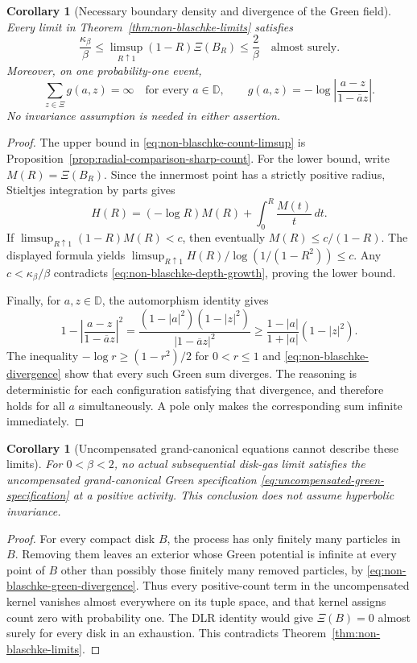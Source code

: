 \documentclass[11pt,a4paper]{article}
\numberwithin{equation}{section}
\newtheorem{corollary}[theorem]{Corollary}
\theoremstyle{definition}
\theoremstyle{remark}
\newcommand{\D}{\mathbb D}
\begin{document}
\begin{corollary}[Necessary boundary density and divergence of the Green field]
\label{cor:non-blaschke-boundary-consequences}
Every limit in Theorem~\ref{thm:non-blaschke-limits} satisfies
\begin{equation}
 \frac{\kappa_\beta}{\beta}
 \le\limsup_{R\uparrow1}(1-R)\Xi(B_R)
 \le\frac2\beta
 \quad\text{almost surely}.
 \label{eq:non-blaschke-count-limsup}
\end{equation}
Moreover, on one probability-one event,
\begin{equation}
 \sum_{z\in\Xi}g(a,z)=\infty
 \quad\text{for every }a\in\D,
 \qquad g(a,z)=-\log\left|\frac{a-z}{1-\overline a z}\right|.
 \label{eq:non-blaschke-green-divergence}
\end{equation}
No invariance assumption is needed in either assertion.
\end{corollary}
\begin{proof}
The upper bound in \eqref{eq:non-blaschke-count-limsup} is
Proposition~\ref{prop:radial-comparison-sharp-count}. For the lower
bound, write $M(R)=\Xi(B_R)$. Since the innermost point has a
strictly positive radius, Stieltjes integration by parts gives
\[
 H(R)=(-\log R)M(R)+\int_0^R\frac{M(t)}t\,dt.
\]
If $\limsup_{R\uparrow1}(1-R)M(R)<c$, then eventually
$M(R)\le c/(1-R)$. The displayed formula yields
$\limsup_{R\uparrow1}H(R)/\log(1/(1-R^2))\le c$.
Any $c<\kappa_\beta/\beta$ contradicts
\eqref{eq:non-blaschke-depth-growth}, proving the lower bound.

Finally, for $a,z\in\D$, the automorphism identity gives
\[
 1-\left|\frac{a-z}{1-\overline a z}\right|^2
 =\frac{(1-|a|^2)(1-|z|^2)}{|1-\overline a z|^2}
 \ge\frac{1-|a|}{1+|a|}(1-|z|^2).
\]
The inequality $-\log r\ge(1-r^2)/2$ for $0<r\le1$ and
\eqref{eq:non-blaschke-divergence} show that every such Green
sum diverges. The reasoning is deterministic for each configuration
satisfying that divergence, and therefore holds for all $a$
simultaneously. A pole only makes the corresponding sum infinite
immediately.
\end{proof}

\begin{corollary}[Uncompensated grand-canonical equations cannot describe these limits]
\label{cor:actual-limit-uncompensated-green-impossible}
For $0<\beta<2$, no actual subsequential disk-gas limit satisfies
the uncompensated grand-canonical Green specification
\eqref{eq:uncompensated-green-specification} at a positive activity.
This conclusion does not assume hyperbolic invariance.
\end{corollary}
\begin{proof}
For every compact disk $B$, the process has only finitely many
particles in $B$. Removing them leaves an exterior whose Green
potential is infinite at every point of $B$ other than possibly
those finitely many removed particles, by
\eqref{eq:non-blaschke-green-divergence}. Thus every positive-count
term in the uncompensated kernel vanishes almost everywhere on
its tuple space, and that kernel assigns count zero with probability
one. The DLR identity would give $\Xi(B)=0$ almost surely for
every disk in an exhaustion. This contradicts
Theorem~\ref{thm:non-blaschke-limits}.
\end{proof}
\end{document}
